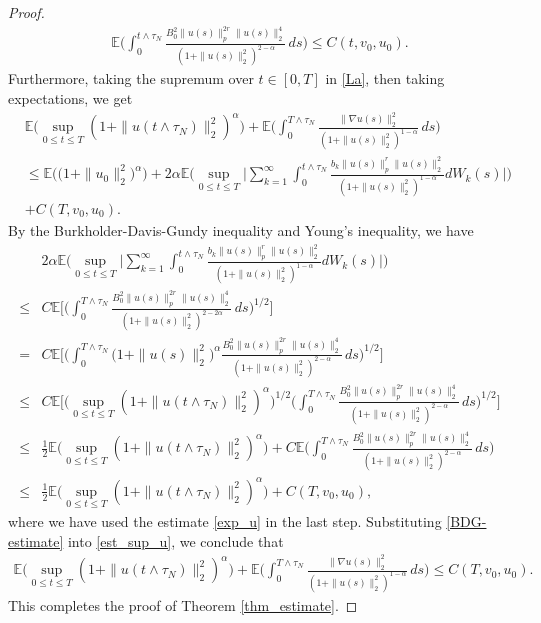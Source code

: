 \documentclass[10pt,a4paper]{amsart}
\begin{document}
\begin{proof}
	\begin{align}
		\label{exp_u}
		\mathbb E\Big(\int_0^{t\wedge{\tau_N}}
		\frac{{B_0^2}\|u(s)\|_p^{2r}\|u(s)\|_2^4}
		{(1+\|u(s)\|_2^2)^{2-\alpha}}\,ds\Big)
		\le C(t,v_0,u_0).
	\end{align}
     Furthermore, taking the supremum over $t\in[0,T]$ in \eqref{La}, then taking expectations, we get
	\begin{align}
		\label{est_sup_u}
		&\mathbb E\Big(\sup_{0\le t\le T}(1+\|u(t\wedge{\tau_N})\|_2^2)^\alpha\Big)+\mathbb{E}\Big(\int_0^{T\wedge{\tau_N}}
		\frac{\|\nabla u(s)\|_2^2}{(1+\|u(s)\|_2^2)^{1-\alpha}}\,ds\Big)
		\nonumber\\
		&\le
		\mathbb E\big(\big(1+\|u_0\|_2^2\big)^\alpha\big)
		+2\alpha\mathbb E\Big(\sup_{0\le t\le T}
		\Big|
		\sum_{k=1}^\infty\int_0^{t\wedge{\tau_N}}
		\frac{b_k\|u(s)\|_p^r\|u(s)\|_2^2}{(1+\|u(s)\|_2^2)^{1-\alpha}}dW_k(s)
		\Big|\Big)
		\nonumber\\
&+C(T,v_0,u_0).
	\end{align}
	By the Burkholder-Davis-Gundy inequality and Young's inequality,  we have 
	\begin{align}
		\label{BDG-estimate}
		&2\alpha\mathbb E\Big(\sup_{0\le t\le T}
		\Big|
		\sum_{k=1}^\infty\int_0^{t\wedge{\tau_N}}
		\frac{b_k\|u(s)\|_p^r\|u(s)\|_2^2}{(1+\|u(s)\|_2^2)^{1-\alpha}}dW_k(s)
		\Big|\Big)
		\nonumber\\
		\le&
		C\mathbb E\Big[\Big(
		\int_0^{T\wedge{\tau_N}}
		\frac{{B_0^2}\|u(s)\|_p^{2r}\|u(s)\|_2^4}
		{(1+\|u(s)\|_2^2)^{2-2\alpha}}\,ds
		\Big)^{1/2}\Big]
		\nonumber\\
		=&
		C\mathbb E\Big[\Big(
		\int_0^{T\wedge{\tau_N}}
		\big(1+\|u(s)\|_2^2\big)^\alpha
		\frac{{B_0^2}\|u(s)\|_p^{2r}\|u(s)\|_2^4}
		{(1+\|u(s)\|_2^2)^{2-\alpha}}\,ds
		\Big)^{1/2}\Big]
		\nonumber\\
		\le&
		C\mathbb E\Big[
		\Big(
		\sup_{0\le t\le T}(1+\|u(t\wedge{\tau_N})\|_2^2)^\alpha
		\Big)^{1/2}
		\Big(
		\int_0^{T\wedge{\tau_N}}
		\frac{{B_0^2}\|u(s)\|_p^{2r}\|u(s)\|_2^4}
		{(1+\|u(s)\|_2^2)^{2-\alpha}}\,ds
		\Big)^{1/2}
		\Big]
		\nonumber\\
		\le&
		\frac12\mathbb E\Big(\sup_{0\le t\le T}(1+\|u(t\wedge{\tau_N})\|_2^2)^\alpha\Big)
		+C\mathbb E\Big(\int_0^{T\wedge{\tau_N}}
		\frac{{B_0^2}\|u(s)\|_p^{2r}\|u(s)\|_2^4}
		{(1+\|u(s)\|_2^2)^{2-\alpha}}\,ds\Big)
		\nonumber\\
		\le&
		\frac12\mathbb E\Big(\sup_{0\le t\le T}(1+\|u(t\wedge{\tau_N})\|_2^2)^\alpha\Big)
		+C(T,v_0,u_0),
	\end{align}
	where we have used the estimate \eqref{exp_u} in the last step.  Substituting \eqref{BDG-estimate} into \eqref{est_sup_u}, we conclude that
	\begin{align}
	    \mathbb E\Big(\sup_{0\le t\le T}(1+\|u(t\wedge\tau_N)\|_2^2)^\alpha\Big)+\mathbb{E}\Big(\int_0^{T\wedge{\tau_N}}
		\frac{\|\nabla u(s)\|_2^2}{(1+\|u(s)\|_2^2)^{1-\alpha}}\,ds\Big)
	\le C(T,v_0,u_0).
	\end{align}
    This completes the proof of Theorem \ref{thm_estimate}.
     \end{proof}
\end{document}
